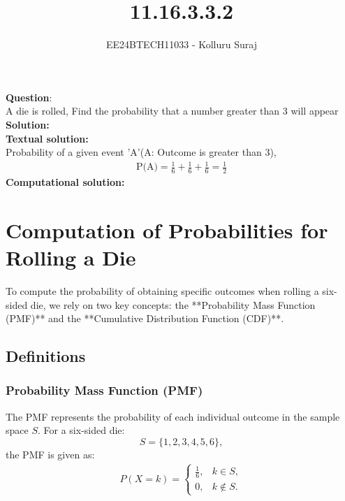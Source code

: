 \documentclass[journal]{IEEEtran}
\begin{document}
	
	
	\vspace{3cm}
	
	\title{11.16.3.3.2}
	\author{EE24BTECH11033 - Kolluru Suraj }
	{\let\newpage\relax\maketitle}
	
	\renewcommand{\thefigure}{\theenumi}
	\renewcommand{\thetable}{\theenumi}
	\setlength{\intextsep}{10pt} %
	
	
	\renewcommand{\thetable}{\theenumi}
	
	
\textbf{Question}:\\
A die is rolled, Find the probability that a number greater than 3 will appear \\
\textbf{Solution: }\\
\textbf{Textual solution: }\\
Probability of a given event 'A'(A: Outcome is greater than 3),\\
\begin{align}
    \text{P(A)}=\frac{1}{6}+\frac{1}{6}+\frac{1}{6}=\frac{1}{2}
\end{align}
\textbf{Computational solution: }\\



\section*{Computation of Probabilities for Rolling a Die}

To compute the probability of obtaining specific outcomes when rolling a six-sided die, we rely on two key concepts: the **Probability Mass Function (PMF)** and the **Cumulative Distribution Function (CDF)**.

\subsection*{Definitions}
\subsubsection*{Probability Mass Function (PMF)}
The PMF represents the probability of each individual outcome in the sample space \( S \). For a six-sided die:
\[
S = \{1, 2, 3, 4, 5, 6\},
\]
the PMF is given as:
\begin{align}
P(X = k) = 
\begin{cases} 
\frac{1}{6}, & k \in S, \\ 
0, & k \notin S.
\end{cases}
\end{align}
\end{document}
